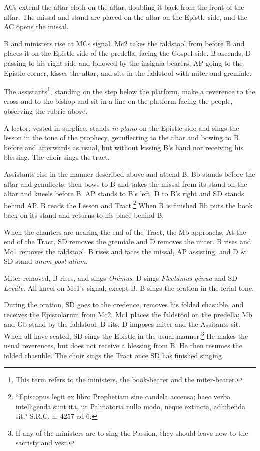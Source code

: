 {    \rubric ACs extend the altar cloth on the altar, doubling it back from the
    front of the altar. The missal and stand are placed on the altar on the
    Epistle side, and the AC opens the missal.

    \rubric B and ministers rise at MCs signal. Mc2 takes the faldstool from
    before B and places it on the Epistle side of the predella, facing the
    Gospel side. B ascends, D passing to his right side and followed by the
    insignia bearers, AP going to the Epistle corner, kisses the altar, and
    sits in the faldstool with miter and gremiale.

    \rubric The assistants\footnote{This term refers to the ministers, the
    book-bearer and the miter-bearer.}, standing on the step below the
    platform, make a reverence to the cross and to the bishop and sit in a line
    on the platform facing the people, observing the rubric above.

    \rubric A lector, vested in surplice, stands \textit{in plano} on the
    Epistle side and sings the lesson in the tone of the prophecy, genuflecting
    to the altar and bowing to B before and afterwards as usual, but without
    kissing B's hand nor receiving his blessing. The choir sings the tract.

    \rubric Assistants rise in the manner described above and attend B. Bb
    stands before the altar and genuflects, then bows to B and takes the missal
    from its stand on the altar and kneels before B. AP stands to B's left, D
    to B's right and SD stands behind AP. B reads the Lesson and
    Tract.\footnote{``Episcopus legit ex libro Prophetiam sine candela accensa;
    haec verba intelligenda sunt ita, ut Palmatoria nullo modo, neque extincta,
adhibenda sit.'' S.R.C. n. 4257 ad 6.} When B is finished Bb puts the book back
on its stand and returns to his place behind B.


    \rubric When the chanters are nearing the end of the Tract, the Mb
    approachs. At the end of the Tract, SD removes the gremiale and D removes
    the miter. B rises and Mc1 removes the faldstool. B rises and faces the
    missal, AP assisting, and D \& SD stand \textit{unum post alium}.

    \rubric Miter removed, B rises, and sings \textit{Orémus}. D sings
    \textit{Flectámus génua} and SD \textit{Leváte}. All kneel on Mc1's signal,
    except B. B sings the oration in the ferial tone.

    \rubric During the oration, SD goes to the credence, removes his folded
    chasuble, and receives the Epistolarum from Mc2. Mc1 places the faldstool
    on the predella; Mb and Gb stand by the faldstool. B sits, D imposes miter
    and the Assitants sit. When all have seated, SD sings the Epistle in the
    usual manner.\footnote{If any of the ministers are to sing the Passion,
    they should leave now to the sacristy and vest.} He makes the usual
    reverences, but does not receive a blessing from B. He then resumes the
    folded chasuble. The choir sings the Tract once SD has finished singing.

}
